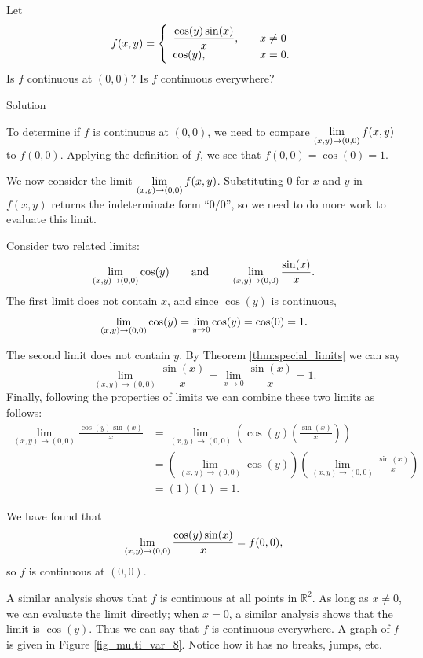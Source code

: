 \begin{example}\label{ex_multicont1}
Let $$\displaystyle f(x,y) = \left\{ \begin{array}{ll} \dfrac{\cos (y)\sin(x)}{x}, & \quad x\neq 0 \\
																						\cos(y), & \quad x=0.
													\end{array} \right.$$ Is $f$ continuous at $(0,0)$? Is $f$ continuous everywhere?

Solution 

To determine if $f$ is continuous at $(0,0)$, we need to compare $\displaystyle\lim_{(x,y)\to (0,0)} f(x,y)$ to $f(0,0)$. 
Applying the definition of $f$, we see that $f(0,0) = \cos(0) = 1$. 

We now consider the limit $\displaystyle \lim_{(x,y)\to (0,0)} f(x,y)$. Substituting $0$ for $x$ and $y$ in $f(x,y)$ returns the indeterminate form ``0/0'', so we need to do more work to evaluate this limit.

Consider two related limits: 
$$\displaystyle \lim_{(x,y)\to (0,0)} \cos(y)\qquad\text{and}\qquad \displaystyle \lim_{(x,y)\to(0,0)} \frac{\sin(x)}x.$$ The first limit does not contain $x$, and since $\cos(y)$ is continuous, $$\displaystyle \lim_{(x,y)\to (0,0)} \cos(y) =\lim_{y\to 0} \cos(y) = \cos(0) = 1.$$

The second limit does not contain $y$. By Theorem \ref{thm:special_limits} we can say
$$\lim_{(x,y)\to (0,0)} \frac{\sin(x)}{x} = \lim_{x\to 0} \frac{\sin(x)}{x} = 1.$$
Finally, following the properties of limits we can combine these two limits as follows:
\allowdisplaybreaks
\begin{align*}
\lim_{(x,y)\to (0,0)} \frac{\cos(y)\sin(x)}{x} &= \lim_{(x,y)\to (0,0)} \left(\cos(y)\left(\frac{\sin(x)}{x}\right)\right) \\ 
 & =\left(\lim_{(x,y)\to (0,0)} \cos(y)\right)\left(\lim_{(x,y)\to (0,0)} \frac{\sin(x)}{x}\right) \\
  & = (1)(1)=1.
\end{align*}

We have found that $$\displaystyle \lim_{(x,y)\to (0,0)} \frac{\cos(y)\sin(x)}{x} = f(0,0),$$ so $f$ is continuous at $(0,0)$.

A similar analysis shows that $f$ is continuous at all points in $\mathbb{R}^2$. As long as $x\neq0$, we can evaluate the limit directly; when $x=0$, a similar analysis shows that the limit is $\cos(y)$. Thus we can say that $f$ is continuous everywhere. A graph of $f$ is given in Figure \ref{fig_multi_var_8}. Notice how it has no breaks, jumps, etc.


\end{example}

